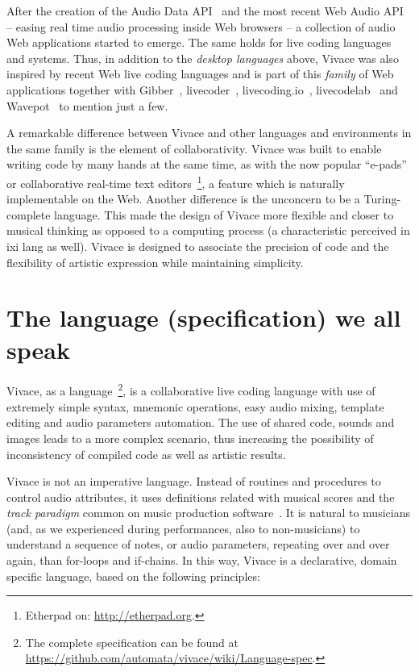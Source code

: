 \documentclass[12pt,times,twocolumn]{article}
\begin{document}
After the creation of the Audio Data API~\cite{audiodata} and the most
recent Web Audio API~\cite{webaudio} -- easing real time audio
processing inside Web browsers -- a collection of audio Web
applications started to emerge. The same holds for live coding
languages and systems.  Thus, in addition to the \textit{desktop
  languages} above, Vivace was also inspired by recent Web
live coding languages and is part of this \textit{family} of Web
applications together with Gibber~\cite{gibber},
livecoder~\cite{livecoder}, livecoding.io~\cite{livecodingio}, 
livecodelab~\cite{livecodelab} and Wavepot~\cite{wavepot} to mention just a few.

A remarkable difference between Vivace and other languages and
environments in the same family is the element of
collaborativity. Vivace was built to enable writing code by many
hands at the same time, as with the now popular ``e-pads'' or
collaborative real-time text editors~\footnote{Etherpad on:
  \url{http://etherpad.org}.}, a feature which is naturally
implementable on the Web. Another difference is the unconcern to be a
Turing-complete language. This made the design of Vivace more flexible
and closer to musical thinking as opposed to a computing process (a
characteristic perceived in ixi lang as well). Vivace is designed to
associate the precision of code and the flexibility of artistic
expression while maintaining simplicity.

\section{The language (specification) we all speak}

Vivace, as a language~\footnote{The complete specification can be
  found at
  \url{https://github.com/automata/vivace/wiki/Language-spec}.}, is a
collaborative live coding language with use of extremely simple
syntax, mnemonic operations, easy audio mixing, template editing and
audio parameters automation. The use of shared code, sounds and images
leads to a more complex scenario, thus increasing the possibility of
inconsistency of compiled code as well as artistic
results.

Vivace is not an imperative language. Instead of routines and
procedures to control audio attributes, it uses definitions related
with musical scores and the \emph{track paradigm} common on music
production software~\cite{collins2011live}. It is natural to musicians (and, as we
experienced during performances, also to non-musicians) to understand
a sequence of notes, or audio parameters, repeating over and over
again, than for-loops and if-chains. In this way, Vivace is a
declarative, domain specific language, based on the following
principles:
\end{document}
